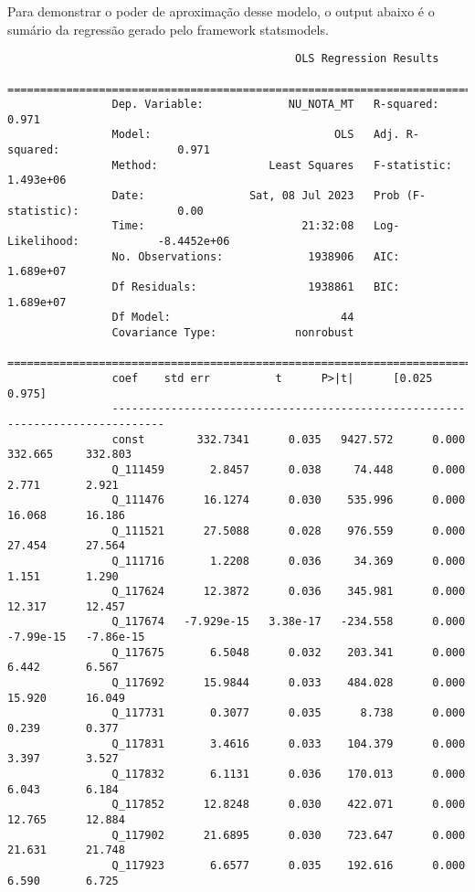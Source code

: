 \documentclass[
	article,			%
	11pt,				%
	oneside,			%
	a4paper,			%
	english,			%
	brazil,				%
	sumario=tradicional
]{abntex2}
\begin{document}
			Para demonstrar o poder de aproximação desse modelo, o output abaixo é o sumário da regressão gerado pelo framework statsmodels.
			
			\begin{verbatim}
				                            OLS Regression Results                            
				==============================================================================
				Dep. Variable:             NU_NOTA_MT   R-squared:                       0.971
				Model:                            OLS   Adj. R-squared:                  0.971
				Method:                 Least Squares   F-statistic:                 1.493e+06
				Date:                Sat, 08 Jul 2023   Prob (F-statistic):               0.00
				Time:                        21:32:08   Log-Likelihood:            -8.4452e+06
				No. Observations:             1938906   AIC:                         1.689e+07
				Df Residuals:                 1938861   BIC:                         1.689e+07
				Df Model:                          44                                         
				Covariance Type:            nonrobust                                         
				==============================================================================
				coef    std err          t      P>|t|      [0.025      0.975]
				------------------------------------------------------------------------------
				const        332.7341      0.035   9427.572      0.000     332.665     332.803
				Q_111459       2.8457      0.038     74.448      0.000       2.771       2.921
				Q_111476      16.1274      0.030    535.996      0.000      16.068      16.186
				Q_111521      27.5088      0.028    976.559      0.000      27.454      27.564
				Q_111716       1.2208      0.036     34.369      0.000       1.151       1.290
				Q_117624      12.3872      0.036    345.981      0.000      12.317      12.457
				Q_117674   -7.929e-15   3.38e-17   -234.558      0.000   -7.99e-15   -7.86e-15
				Q_117675       6.5048      0.032    203.341      0.000       6.442       6.567
				Q_117692      15.9844      0.033    484.028      0.000      15.920      16.049
				Q_117731       0.3077      0.035      8.738      0.000       0.239       0.377
				Q_117831       3.4616      0.033    104.379      0.000       3.397       3.527
				Q_117832       6.1131      0.036    170.013      0.000       6.043       6.184
				Q_117852      12.8248      0.030    422.071      0.000      12.765      12.884
				Q_117902      21.6895      0.030    723.647      0.000      21.631      21.748
				Q_117923       6.6577      0.035    192.616      0.000       6.590       6.725

\end{verbatim}
\end{document}
